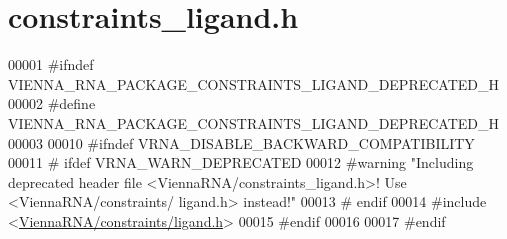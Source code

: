 \hypertarget{constraints__ligand_8h_source}{}\section{constraints\+\_\+ligand.\+h}
\label{constraints__ligand_8h_source}

\begin{DoxyCode}
00001 \textcolor{preprocessor}{#ifndef VIENNA\_RNA\_PACKAGE\_CONSTRAINTS\_LIGAND\_DEPRECATED\_H}
00002 \textcolor{preprocessor}{#define VIENNA\_RNA\_PACKAGE\_CONSTRAINTS\_LIGAND\_DEPRECATED\_H}
00003 
00010 \textcolor{preprocessor}{#ifndef VRNA\_DISABLE\_BACKWARD\_COMPATIBILITY}
00011 \textcolor{preprocessor}{# ifdef VRNA\_WARN\_DEPRECATED}
00012 \textcolor{preprocessor}{#warning "Including deprecated header file <ViennaRNA/constraints\_ligand.h>! Use <ViennaRNA/constraints/
      ligand.h> instead!"}
00013 \textcolor{preprocessor}{# endif}
00014 \textcolor{preprocessor}{#include <\hyperlink{ligand_8h}{ViennaRNA/constraints/ligand.h}>}
00015 \textcolor{preprocessor}{#endif}
00016 
00017 \textcolor{preprocessor}{#endif}
\end{DoxyCode}

